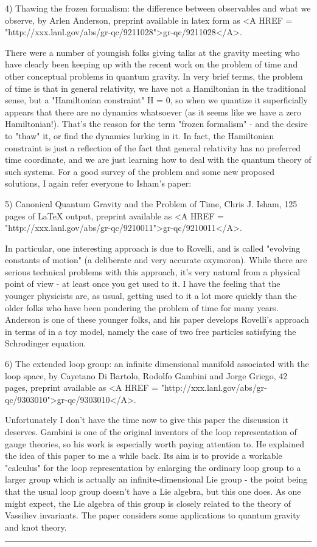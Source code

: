 4)  Thawing the frozen formalism: the difference between observables and
what we observe, by Arlen Anderson, preprint available in latex form as
<A HREF = "http://xxx.lanl.gov/abs/gr-qc/9211028">gr-qc/9211028</A>. 

There were a number of youngish folks giving talks at the gravity
meeting who have clearly been keeping up with the recent work on the
problem of time and other conceptual problems in quantum gravity.  In
very brief terms, the problem of time is that in general relativity, we
have not a Hamiltonian in the traditional sense, but a "Hamiltonian
constraint" H = 0, so when we quantize it superficially appears that
there are no dynamics whatsoever (as it seems like we have a zero 
Hamiltonian!).  That's the reason for the term "frozen formalism" - and
the desire to "thaw" it, or find the dynamics lurking in it.  In fact,
the Hamiltonian constraint is just a reflection of the fact that general
relativity has no preferred time coordinate, and we are just learning
how to deal with the quantum theory of such systems.  For a good survey
of the problem and some new proposed solutions, I again refer everyone
to Isham's paper:

5) Canonical Quantum Gravity and the Problem of Time,
Chris J. Isham, 125 pages of LaTeX output, preprint available as
<A HREF = "http://xxx.lanl.gov/abs/gr-qc/9210011">gr-qc/9210011</A>.

In particular, one interesting approach is due to Rovelli, and is called 
"evolving constants of motion" (a deliberate and very accurate
oxymoron).  While there are serious technical problems with this
approach, it's very natural from a physical point of view - at least
once you get used to it.   I have the feeling that the younger
physicists are, as usual, getting used to it a lot more quickly than the
older folks who have been pondering the problem of time for many years. 
Anderson is one of these younger folks, and his paper develops Rovelli's
approach in terms of  in a toy model, namely the case of two free
particles satisfying the Schrodinger equation.  

6) The extended loop group: an infinite dimensional manifold associated
with the loop space, by Cayetano Di Bartolo, Rodolfo Gambini and Jorge
Griego, 42 pages, preprint available as <A HREF = "http://xxx.lanl.gov/abs/gr-qc/9303010">gr-qc/9303010</A>.

Unfortunately I don't have the time now to give this paper the
discussion it deserves.  Gambini is one of the original inventors of the
loop representation of gauge theories, so his work is especially worth
paying attention to.  He explained the idea of this paper to me a while
back.  Its aim is to provide a workable "calculus" for the loop
representation by enlarging the ordinary loop group to a larger group
which is actually an infinite-dimensional Lie group - the point being
that the usual loop group doesn't have a Lie algebra, but this one does.
As one might expect, the Lie algebra of this group is closely related to
the theory of Vassiliev invariants.  The paper considers some
applications to quantum gravity and knot theory.
\par\noindent\rule{\textwidth}{0.4pt}

